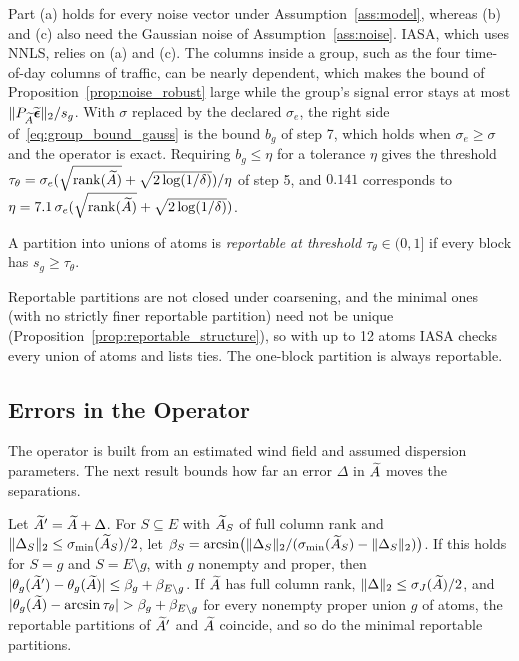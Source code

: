 \begin{remark}
Part (a) holds for every noise vector under Assumption~\ref{ass:model}, whereas (b) and
(c) also need the Gaussian noise of Assumption~\ref{ass:noise}.  IASA, which uses NNLS, relies on
(a) and (c).  The columns inside a group, such as the four time-of-day columns of
traffic, can be nearly dependent, which makes the bound of
Proposition~\ref{prop:noise_robust} large while the group's signal error stays at most
\(\|P_{\widetilde A}\widetilde{\boldsymbol\epsilon}\|_2/s_g\).  With \(\sigma\) replaced by the
declared \(\sigma_e\), the right side of~\eqref{eq:group_bound_gauss} is the bound
\(b_g\) of step 7, which holds when \(\sigma_e\ge\sigma\) and the operator is exact.  Requiring \(b_g\le\eta\) for a tolerance \(\eta\) gives
the threshold \(\tau_\theta=\sigma_e(\sqrt{\operatorname{rank}(\widetilde A)}+\sqrt{2\log(1/\delta)})/\eta\)
of step 5, and \(0.141\) corresponds to \(\eta=7.1\,\sigma_e(\sqrt{\operatorname{rank}(\widetilde A)}+\sqrt{2\log(1/\delta)})\).
\end{remark}

\begin{definition}
\label{def:reportable}
A partition into unions of atoms is \emph{reportable at threshold
\(\tau_\theta\in(0,1]\)} if every block has \(s_g\ge\tau_\theta\).
\end{definition}

Reportable partitions are not closed under coarsening, and the minimal ones (with no
strictly finer reportable partition) need not be unique
(Proposition~\ref{prop:reportable_structure}), so with up to 12 atoms IASA checks every
union of atoms and lists ties.  The one-block partition is always reportable.

\subsection{Errors in the Operator}
\label{subsec:operator_error}

The operator is built from an estimated wind field and assumed dispersion parameters.
The next result bounds how far an error \(\Delta\) in \(\widetilde A\) moves the separations.

\begin{proposition}
\label{prop:grouping_stability}
Let \(\widetilde A'=\widetilde A+\Delta\).  For \(S\subseteq E\) with \(\widetilde A_S\) of full column rank and
\(\|\Delta_S\|_2\le\sigma_{\min}(\widetilde A_S)/2\), let
\(\beta_S=\arcsin\bigl(\|\Delta_S\|_2/(\sigma_{\min}(\widetilde A_S)-\|\Delta_S\|_2)\bigr)\).
If this holds for \(S=g\) and \(S=E\setminus g\), with \(g\) nonempty and proper, then
\(|\theta_g(\widetilde A')-\theta_g(\widetilde A)|\le\beta_g+\beta_{E\setminus g}\).  If \(\widetilde A\) has full
column rank, \(\|\Delta\|_2\le\sigma_J(\widetilde A)/2\), and
\(|\theta_g(\At)-\arcsin\tau_\theta|>\beta_g+\beta_{E\setminus g}\) for every nonempty
proper union \(g\) of atoms, the reportable partitions of \(\widetilde A'\) and \(\widetilde A\) coincide,
and so do the minimal reportable partitions.
\end{proposition}

